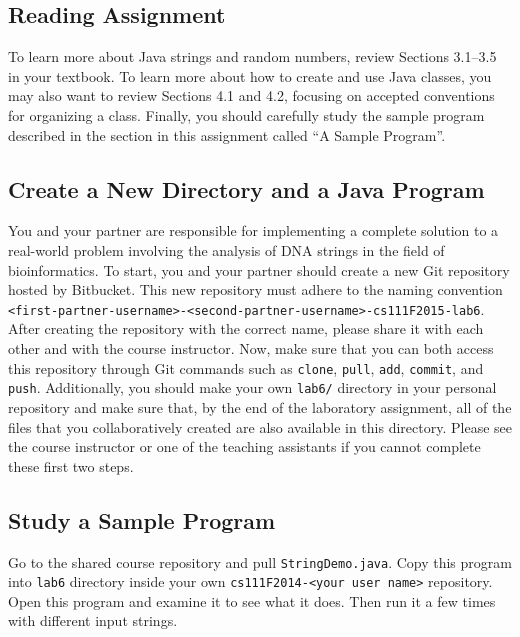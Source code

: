 \vspace{-0.15in}
\subsection*{Reading Assignment}
\vspace{-0.05in}

To learn more about Java strings and random numbers, review Sections 3.1--3.5 in your textbook. To learn more about how
to create and use Java classes, you may also want to review Sections 4.1 and 4.2, focusing on accepted conventions for
organizing a class. Finally, you should carefully study the sample program described in the section in this assignment
called ``{A Sample Program}''.

\vspace{-0.05in}
\subsection*{Create a New Directory and a Java Program}
\vspace{-0.05in}

You and your partner are responsible for implementing a complete solution to a real-world problem involving the analysis
of DNA strings in the field of bioinformatics. To start, you and your partner should create a new Git repository hosted
by Bitbucket. This new repository must adhere to the naming convention {\tt
<first-partner-username>-<second-partner-username>-cs111F2015-lab6}. After creating the repository with the correct
name, please share it with each other and with the course instructor. Now, make sure that you can both access this
repository through Git commands such as {\tt clone}, {\tt pull}, {\tt add}, {\tt commit}, and {\tt push}. Additionally,
you should make your own {\tt lab6/} directory in your personal repository and make sure that, by the end of the
laboratory assignment, all of the files that you collaboratively created are also available in this directory. Please
see the course instructor or one of the teaching assistants if you cannot complete these first two steps.


\vspace{-0.05in}
\subsection*{Study a Sample Program}
\vspace{-0.05in}
Go to the shared course repository and pull {\tt StringDemo.java}. Copy this program into {\tt lab6} directory
inside your own {\tt cs111F2014-<your user name>} repository.
Open this program and examine it to see what it does. Then
run it a few times with different input strings.\\


